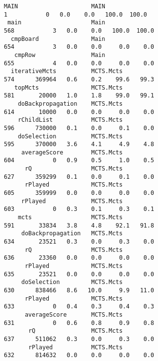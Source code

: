 \begin{tiny}
\begin{verbatim}
MAIN                     MAIN                                                   1           0   0.0    0.0   100.0  100.0
 main                    Main                                                 568           3   0.0    0.0   100.0  100.0
  cmpBoard               Main                                                 654           3   0.0    0.0     0.0    0.0
   cmpRow                Main                                                 655           4   0.0    0.0     0.0    0.0
  iterativeMcts          MCTS.Mcts                                            574      369964   0.6    0.2    99.6   99.3
   topMcts               MCTS.Mcts                                            581       20000   1.0    1.8    99.0   99.1
    doBackpropagation    MCTS.Mcts                                            614       10000   0.0    0.0     0.0    0.0
    rChildList           MCTS.Mcts                                            596      730000   0.1    0.0     0.1    0.0
    doSelection          MCTS.Mcts                                            595      370000   3.6    4.1     4.9    4.8
     averageScore        MCTS.Mcts                                            604           0   0.9    0.5     1.0    0.5
      rQ                 MCTS.Mcts                                            627      359299   0.1    0.0     0.1    0.0
      rPlayed            MCTS.Mcts                                            605      359999   0.0    0.0     0.0    0.0
     rPlayed             MCTS.Mcts                                            603           0   0.3    0.1     0.3    0.1
    mcts                 MCTS.Mcts                                            591       33834   3.8    4.8    92.1   91.8
     doBackpropagation   MCTS.Mcts                                            634       23521   0.3    0.0     0.3    0.0
      rQ                 MCTS.Mcts                                            636       23360   0.0    0.0     0.0    0.0
      rPlayed            MCTS.Mcts                                            635       23521   0.0    0.0     0.0    0.0
     doSelection         MCTS.Mcts                                            630      838466   8.6   10.0     9.9   11.0
      rPlayed            MCTS.Mcts                                            633           0   0.4    0.3     0.4    0.3
      averageScore       MCTS.Mcts                                            631           0   0.6    0.8     0.9    0.8
       rQ                MCTS.Mcts                                            637      511062   0.3    0.0     0.3    0.0
       rPlayed           MCTS.Mcts                                            632      814632   0.0    0.0     0.0    0.0

\end{verbatim}
\end{tiny}
